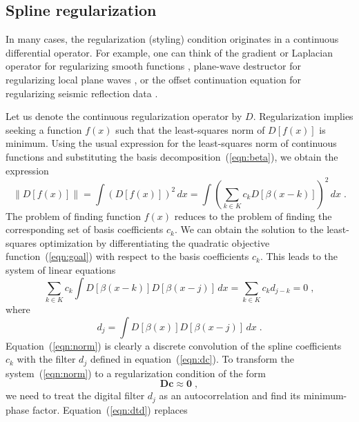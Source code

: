 \subsection{Spline regularization}
In many cases, the regularization (styling) condition originates in a
continuous differential operator. For example, one can think of the
gradient or Laplacian operator for regularizing smooth functions
\cite[]{Fomel.sep.103.sergey1}, plane-wave destructor for regularizing
local plane waves \cite[]{Fomel.sep.105.sergey1}, or the offset
continuation equation for regularizing seismic reflection data
\cite[]{Fomel.sep.103.sergey2}. 
\par
Let us denote the continuous regularization operator by $D$.
Regularization implies seeking a function $f(x)$ such that the
least-squares norm of $D\left[f(x)\right]$ is minimum. Using the usual
expression for the least-squares norm of continuous functions and
substituting the basis decomposition~(\ref{eqn:beta}), we obtain 
the expression
\begin{equation}
  \label{eqn:goal}
  \left\|D\left[f(x)\right]\right\| = 
  \int \left(D\left[f(x)\right]\right)^2\,dx =
  \int \left(\sum_{k \in K} c_k D\left[ \beta (x-k)\right]\right)^2\,dx\;.
\end{equation}
The problem of finding function $f(x)$ reduces to the problem of
finding the corresponding set of basis coefficients $c_k$. We can
obtain the solution to the least-squares optimization by
differentiating the quadratic objective function~(\ref{eqn:goal}) with
respect to the basis coefficients $c_k$. This leads to the system of
linear equations
\begin{equation}
  \label{eqn:norm}
  \sum_{k \in K} c_k \int D \left[\beta (x-k)\right] 
  D\left[\beta (x-j)\right] \,dx = 
  \sum_{k \in K} c_k d_{j-k} = 0\;,
\end{equation}
where
\begin{equation}
\label{eqn:dc}
d_j = \int D\left[\beta (x)\right] D\left[\beta (x-j)\right]\,dx\;.
\end{equation}
Equation~(\ref{eqn:norm}) is clearly a discrete convolution of the
spline coefficients~$c_k$ with the filter $d_j$ defined in
equation~(\ref{eqn:dc}). To transform the system~(\ref{eqn:norm}) to a
regularization condition of the form
\begin{equation}
  \label{eqn:dtd}
  \mathbf{D c} \approx \mathbf{0}\;,
\end{equation}
we need to treat the digital filter $d_j$ as an autocorrelation and
find its minimum-phase factor. Equation~(\ref{eqn:dtd}) replaces
